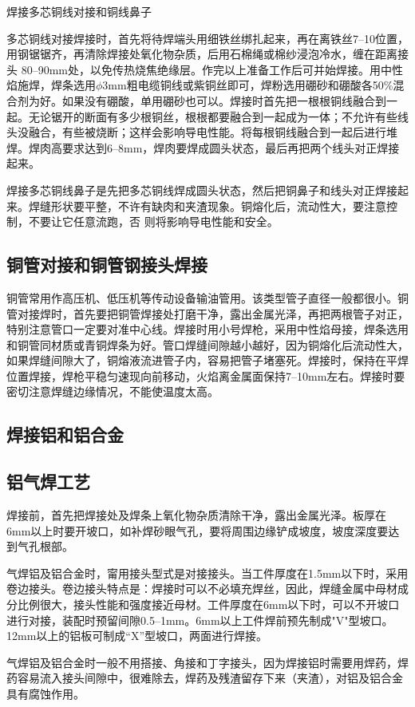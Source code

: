 \documentclass{ctexbook}
\begin{document}
焊接多芯铜线对接和铜线鼻子

多芯铜线对接焊接时，首先将待焊端头用细铁丝绑扎起来，再在离铁丝7--10位置，用钢锯锯齐，再清除焊接处氧化物杂质，后用石棉绳或棉纱浸泡冷水，缠在距离接头
80--90mm处，以免传热烧焦绝缘层。作完以上准备工作后可并始焊接。用中性焰施焊，焊条选用$\phi$3mm粗电缆铜线或紫铜丝即可，焊粉选用硼砂和硼酸各50\%混合剂为好。如果没有硼酸，单用硼砂也可以。焊接时首先把一根根铜线融合到一起。无论锯开的断面有多少根铜丝，根根都要融合到一起成为一体；不允许有些线头没融合，有些被烧断；这样会影响导电性能。将每根铜线融合到一起后进行堆焊。焊肉高要求达到6--8mm，焊肉要焊成圆头状态，最后再把两个线头对正焊接起来。

焊接多芯铜线鼻子是先把多芯铜线焊成圆头状态，然后把铜鼻子和线头对正焊接起来。焊缝形状要平整，不许有缺肉和夹渣现象。铜熔化后，流动性大，要注意控制，不要让它任意流跑，否
则将影响导电性能和安全。
\subsection{铜管对接和铜管钢接头焊接}
铜管常用作高压机、低压机等传动设备输油管用。该类型管子直径一般都很小。铜管对接焊时，首先要把铜管焊接处打磨干净，露出金属光泽，再把两根管子对正，特别注意管口一定要对准中心线。焊接时用小号焊枪，采用中性焰母接，焊条选用和铜管同材质或青铜焊条为好。管口焊缝间隙越小越好，因为铜熔化后流动性大，如果焊缝间隙大了，铜熔液流进管子内，容易把管子堵塞死。焊接时，保持在平焊位置焊接，焊枪平稳匀速现向前移动，火焰离金属面保持7--10mm左右。焊接时要密切注意焊缝边缘情况，不能使温度太高。
\subsection{焊接铝和铝合金}
\subsection{铝气焊工艺}	
焊接前，首先把焊接处及焊条上氧化物杂质清除干净，露出金属光泽。板厚在6mm以上时要开坡口，如补焊砂眼气孔，要将周围边缘铲成坡度，坡度深度要达到气孔根部。

气焊铝及铝合金时，甯用接头型式是对接接头。当工件厚度在1.5mm以下时，采用卷边接头。卷边接头特点是：焊接时可以不必填充焊丝，因此，焊缝金属中母材成分比例很大，接头性能和强度接近母材。工件厚度在6mm以下时，可以不开坡口进行对接，装配时预留间隙0.5--1mm。6mm以上工件焊前预先制成"V"型坡口。12mm以上的铝板可制成“X”型坡口，两面进行焊接。

气焊铝及铝合金时一般不用搭接、角接和丁字接头，因为焊接铝时需要用焊药，焊药容易流入接头间隙中，很难除去，焊药及残渣留存下来（夹渣），对铝及铝合金具有腐蚀作用。
\end{document}
